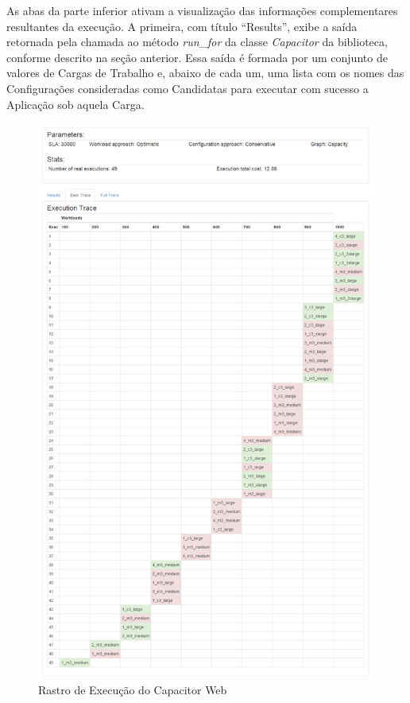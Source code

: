 As abas da parte inferior ativam a visualização das informações complementares 
resultantes da execução. A primeira, com título ``Results'', exibe a saída 
retornada pela chamada ao método \emph{run\_for} da classe \emph{Capacitor} da 
biblioteca, conforme descrito na seção anterior. Essa saída é formada por um 
conjunto de valores de Cargas de Trabalho e, abaixo de cada um, uma lista com os 
nomes das Configurações consideradas como Candidatas para executar com sucesso a 
Aplicação sob aquela Carga.  

\begin{figure}[htb]
  \caption{\label{fig:capacitor_web_trace}Rastro de Execução do Capacitor Web}
  \begin{center}
    \includegraphics[scale=0.45]{img/CapacitorWeb_ExecutionTrace}
  \end{center}
\end{figure}

